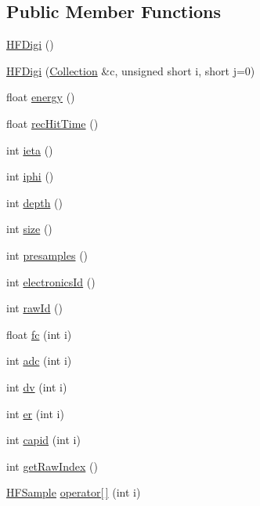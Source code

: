 \subsection*{Public Member Functions}
\begin{DoxyCompactItemize}
\item 
\hyperlink{class_h_f_digi_a9b7e884eb5fbe2b6f093798f1f5417b3}{H\+F\+Digi} ()
\item 
\hyperlink{class_h_f_digi_af79e14f6504a822a93a70e6bffaca2ef}{H\+F\+Digi} (\hyperlink{class_collection}{Collection} \&c, unsigned short i, short j=0)
\item 
float \hyperlink{class_h_f_digi_a63778060b11696ec97f17205ea36bdb4}{energy} ()
\item 
float \hyperlink{class_h_f_digi_a04265763dd24d24360d45fa8f77ae49f}{rec\+Hit\+Time} ()
\item 
int \hyperlink{class_h_f_digi_a33b1576f22f6d8e4495944e486c6c365}{ieta} ()
\item 
int \hyperlink{class_h_f_digi_ac9d87c43f47810ff7103c51619b88cbf}{iphi} ()
\item 
int \hyperlink{class_h_f_digi_aa4f363ba278423a85893306778880db5}{depth} ()
\item 
int \hyperlink{class_h_f_digi_ad29e817757e158c1f50e4510dd31df92}{size} ()
\item 
int \hyperlink{class_h_f_digi_a33992d4a75b4545c1be9f50a6e243710}{presamples} ()
\item 
int \hyperlink{class_h_f_digi_a2d689c4c53b74e67e7a62f3a43a4f665}{electronics\+Id} ()
\item 
int \hyperlink{class_h_f_digi_a702fadfdc85d5cc5a787d9593165fb9d}{raw\+Id} ()
\item 
float \hyperlink{class_h_f_digi_aad37bf192b33e5f3e8dc0d3d1be73348}{fc} (int i)
\item 
int \hyperlink{class_h_f_digi_afd736e6e2a6292cd2e88cac49b7e919d}{adc} (int i)
\item 
int \hyperlink{class_h_f_digi_ac3e816c077f8a09a482c624352123196}{dv} (int i)
\item 
int \hyperlink{class_h_f_digi_ac648135daf87c2f957430ee50ff27fae}{er} (int i)
\item 
int \hyperlink{class_h_f_digi_a05be32bba8288c2041f49d379b66922d}{capid} (int i)
\item 
int \hyperlink{class_h_f_digi_a50c195d9ba9d66f5f80fb6896c3e176e}{get\+Raw\+Index} ()
\item 
\hyperlink{class_h_f_sample}{H\+F\+Sample} \hyperlink{class_h_f_digi_a7ce236696c1c232cc44638fb6edd5987}{operator\mbox{[}$\,$\mbox{]}} (int i)
\end{DoxyCompactItemize}
